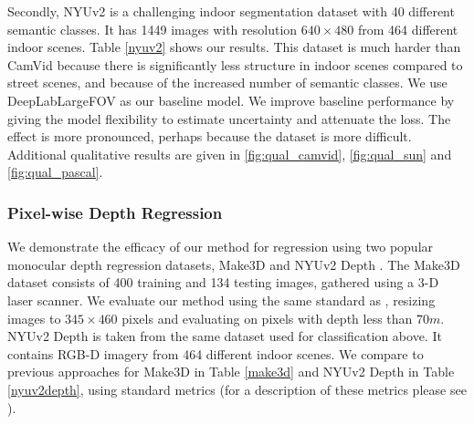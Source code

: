 Secondly, NYUv2 \citep{silberman2012indoor} is a challenging indoor segmentation dataset with 40 different semantic classes. It has 1449 images with resolution $640\times480$ from 464 different indoor scenes. Table \ref{nyuv2} shows our results. This dataset is much harder than CamVid because there is significantly less structure in indoor scenes compared to street scenes, and because of the increased number of semantic classes. We use DeepLabLargeFOV \citep{chen2016deeplab} as our baseline model. We improve baseline performance by giving the model flexibility to estimate uncertainty and attenuate the loss. The effect is more pronounced, perhaps because the dataset is more difficult. Additional qualitative results are given in \cref{fig:qual_camvid}, \cref{fig:qual_sun} and \cref{fig:qual_pascal}.



\subsubsection{Pixel-wise Depth Regression}

We demonstrate the efficacy of our method for regression using two popular monocular depth regression datasets, Make3D \citep{saxena2009make3d} and NYUv2 Depth \citep{silberman2012indoor}. The Make3D dataset consists of 400 training and 134 testing images, gathered using a 3-D laser scanner. We evaluate our method using the same standard as \citep{laina2016deeper}, resizing images to $345\times460$ pixels and evaluating on pixels with depth less than $70m$. NYUv2 Depth is taken from the same dataset used for classification above. It contains RGB-D imagery from 464 different indoor scenes. We compare to previous approaches for Make3D in Table \ref{make3d} and NYUv2 Depth in Table \ref{nyuv2depth}, using standard metrics (for a description of these metrics please see \citep{eigen2014depth}).





